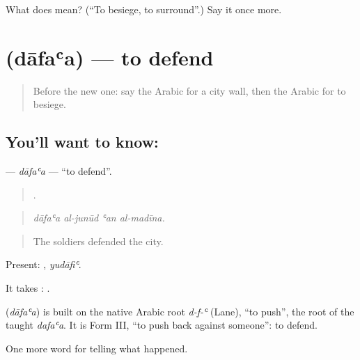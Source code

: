 \begin{tcolorbox}[breakable,colback=teal!4,colframe=teal!35!black,title={Before you move on}]
What does  mean? (\textquotedblleft{}To besiege, to surround\textquotedblright{}.) Say it once more.
\end{tcolorbox}
\section[\texorpdfstring{\ar{دافع} (dāfaʿa)}{دافع (dāfaʿa)}]{ (dāfaʿa) — to defend}

\label{lesson:AR-C322-dafaa-defend}



\begin{quote}
Before the new one: say the Arabic for a city wall, then the Arabic for to besiege.
\end{quote}

\subsection*{You'll want to know: }
\textbf{} — \emph{dāfaʿa} — \textquotedblleft{}to defend\textquotedblright{}.

\begin{quote}
   .
\end{quote}

\begin{quote}
\emph{dāfaʿa al-junūd ʿan al-madīna.}
\end{quote}

\begin{quote}
The soldiers defended the city.
\end{quote}

Present: , \emph{yudāfiʿ}.

It takes :   .

\begin{cousinweb}
\textbf{} (\emph{dāfaʿa}) is built on the native Arabic root \emph{d-f-ʿ} (Lane), \textquotedblleft{}to push\textquotedblright{}, the root of the taught \emph{dafaʿa}. It is Form III, \textquotedblleft{}to push back against someone\textquotedblright{}: to defend.
\end{cousinweb}

\begin{grammarlens}[title={What you've built}]
One more word for telling what happened.
\end{grammarlens}

